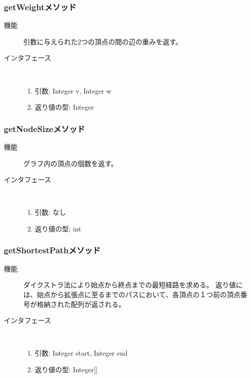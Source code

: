 \documentclass[a4j]{jarticle}
\begin{document}
\subsubsection{getWeightメソッド}

\begin{description}
\item[機能]
引数に与えられた2つの頂点の間の辺の重みを返す。

\item[インタフェース]\ \vspace{0mm}
\begin{enumerate}
  \item 引数: Integer v, Integer w
  \item 返り値の型: Integer
\end{enumerate}
\end{description}

\subsubsection{getNodeSizeメソッド}

\begin{description}
\item[機能]
グラフ内の頂点の個数を返す。

\item[インタフェース]\ \vspace{0mm}
\begin{enumerate}
  \item 引数: なし
  \item 返り値の型: int
\end{enumerate}
\end{description}

\subsubsection{getShortestPathメソッド}

\begin{description}
\item[機能]
ダイクストラ法により始点から終点までの最短経路を求める。
返り値には、始点から拡張点に至るまでのパスにおいて、各頂点の１つ前の頂点番号が格納された配列が返される。

\item[インタフェース]\ \vspace{0mm}
\begin{enumerate}
  \item 引数: Integer start, Integer end
  \item 返り値の型: Integer[]
\end{enumerate}
\end{description}
\end{document}
